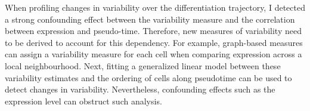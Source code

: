 When profiling changes in variability over the differentiation trajectory, I detected a strong confounding effect between the variability measure and the correlation between expression and pseudo-time. Therefore, new measures of variability need to be derived to account for this dependency. For example, graph-based measures can assign a variability measure for each cell when comparing expression across a local neighbourhood. Next, fitting a generalized linear model between these variability estimates and the ordering of cells along pseudotime can be used to detect changes in variability. Nevertheless, confounding effects such as the expression level can obstruct such analysis.

